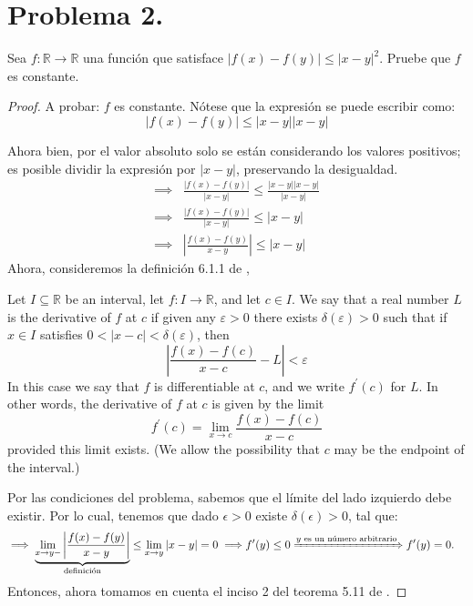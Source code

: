 \section{Problema 2.} Sea $f: \mathbb{R} \rightarrow \mathbb{R}$ una función que satisface $|f(x)-f(y)| \leq|x-y|^{2}$. Pruebe que $f$ es
constante.

\begin{proof}
A probar: $f$ es constante. Nótese que la expresión se puede escribir como: 
$$|f(x)-f(y)| \leq|x-y||x-y|$$

Ahora bien, por el valor absoluto solo se están considerando los valores positivos; es posible dividir la expresión por $|x-y|$, preservando la desigualdad. 
\begin{align*}
    \implies & \frac{|f(x)-f(y)|}{|x-y|} \leq \frac{|x-y||x-y|}{|x-y|}\\
    \implies & \frac{|f(x)-f(y)|}{|x-y|} \leq |x-y|\\
    \implies & \left|\frac{f(x)-f(y)}{x-y}\right|\leq |x-y|
\end{align*}
Ahora, consideremos la definición 6.1.1 de \cite{bartle2000introduction},
\begin{tcolorbox}[colback=blue!15,colframe=blue!1!blue,title=Definición 6.1.1. de \cite{bartle2000introduction}]
Let $I \subseteq \mathbb{R}$ be an interval, let $f: I \rightarrow \mathbb{R}$, and let $c \in I$. We say that a real number $L$ is the derivative of $f$ at $c$ if given any $\varepsilon>0$ there exists $\delta(\varepsilon)>0$ such that if $x \in I$ satisfies $0<|x-c|<\delta(\varepsilon)$, then
$$
\left|\frac{f(x)-f(c)}{x-c}-L\right|<\varepsilon
$$
In this case we say that $f$ is differentiable at $c$, and we write $f^{\prime}(c)$ for $L$. In other words, the derivative of $f$ at $c$ is given by the limit
$$
f^{\prime}(c)=\lim _{x \rightarrow c} \frac{f(x)-f(c)}{x-c}
$$
provided this limit exists. (We allow the possibility that $c$ may be the endpoint of the interval.)
\end{tcolorbox}
Por las condiciones del problema, sabemos que el límite del lado izquierdo debe existir. Por lo cual, tenemos que dado $\epsilon>0$ existe $\delta(\epsilon)>0$, tal que:
\begin{align*}
    \implies  \underbrace{\lim_{x\to y-}\left|\frac{f(x)-f(y)}{x-y}\right|}_{\text{definición}}\leq \lim_{x\to y}|x-y|=0 \implies & f'(y) \leq 0\xRightarrow{y \text{ es un número arbitrario}} f'(y)=0.
\end{align*}
Entonces, ahora tomamos en cuenta el inciso 2 del teorema 5.11 de \cite{rudin1976principles}.

\end{proof}
